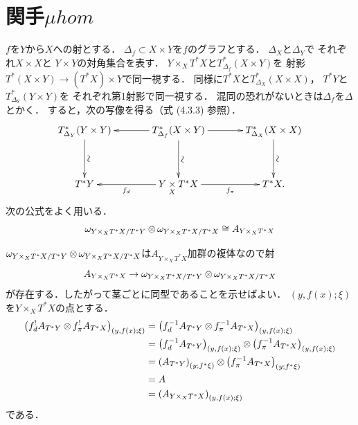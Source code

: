 \documentclass[leqno, 10pt, a4paper, dvipdfmx]{jsarticle}
\makeatletter
\theoremstyle{definition}
\renewenvironment{proof}[1][\proofname]{\par
  \pushQED{\qed}%
  \normalfont \topsep6\p@\@plus6\p@\relax
  \trivlist
  \item[\hskip\labelsep
         \bfseries
    {#1}]\ignorespaces
}{%
  \popQED\endtrivlist\@endpefalse
}
\renewcommand{\proofname}{証明.}
\numberwithin{equation}{section}
\newcommand{\tens}[1][]{\mathbin{\otimes_{\raise1.5ex\hbox to-.1em{}{#1}}}}
\newcommand{\pb}[1][]{\mathbin{\mathop{\times}\limits_{#1}}}
\theoremstyle{mystyle}
\newcommand{\mpb}[1][]{{#1}_{\pi}} %
\newcommand{\mdiff}[1][]{{#1}_{d}} %
\newcommand{\cotb}[1][]{T^{\ast}{#1}}
\newcommand{\muhom}{\mu hom}
\newcommand{\mucat}[2][]{\mathsf{D}^{\mathrm{b}}_{#1}(#2)}
\newcommand{\diag}[1][]{\Delta_{#1}}
\makeatother
\begin{document}
\section{関手\(\muhom\)}
\(f\)を\(Y\)から\(X\)への射とする．
\(\diag[f]\subset X\times Y\)を\(f\)のグラフとする．
\(\diag[X]\)と\(\diag[Y]\)で
それぞれ\(X\times X\)と
\(Y\times Y\)の対角集合を表す．
\(Y\mathbin{\times_{X}}\cotb[X]\)と\(T^{\ast}_{\diag[f]}(X\times Y)\)を
射影\(\cotb[(X\times Y)]\to(\cotb[X])\times Y\)で同一視する．
同様に\(\cotb[X]\)と\(T^{\ast}_{\diag[X]}(X\times X)\)，
\(\cotb[Y]\)と\(T^{\ast}_{\diag[Y]}(Y\times Y)\)を
それぞれ第1射影で同一視する．
混同の恐れがないときは\(\diag[f]\)を\(\diag\)とかく．
すると，次の写像を得る（式 (4.3.3) 参照）．
\begin{equation}\label{eq:4.4.1}
  \vcenter{\xymatrix@C=36pt@R=36pt{
    T^{\ast}_{\diag[Y]}(Y\times Y)
    \ar[d]^-{\rotatebox{90}{\(\sim\)}}
    &
    T^{\ast}_{\diag[f]}(X\times Y)
    \ar[d]^-{\rotatebox{90}{\(\sim\)}}
    \ar[l]
    \ar[r]
    &
    T^{\ast}_{\diag[X]}(X\times X)
    \ar[d]^-{\rotatebox{90}{\(\sim\)}}
    \\
    \cotb[Y]
    &
    Y\pb[X]\cotb[X]
    \ar[l]^-{\mdiff[f]}
    \ar[r]_-{\mpb[f]}
    &
    \cotb[X].
  }}
\end{equation}
次の公式をよく用いる．
\begin{equation}\label{eq:4.4.2}
  \omega_{{Y\mathbin{\times_{X}}\cotb[X]}\mathbin{/}\cotb[Y]}
  \tens[]
  \omega_{{Y\mathbin{\times_{X}}\cotb[X]}\mathbin{/}\cotb[X]}
  \cong
  A_{Y\mathbin{\times_{X}}\cotb[X]}
\end{equation}
\begin{proof}
  \(
    \omega_{{Y\mathbin{\times_{X}}\cotb[X]}\mathbin{/}\cotb[Y]}
    \tens[]
    \omega_{{Y\mathbin{\times_{X}}\cotb[X]}\mathbin{/}\cotb[X]}
  \)は\(A_{Y\mathbin{\times_{X}}\cotb[X]}\)加群の複体なので射
  \[
    A_{Y\mathbin{\times_{X}}\cotb[X]}
    \to
    \omega_{{Y\mathbin{\times_{X}}\cotb[X]}\mathbin{/}\cotb[Y]}
    \tens[]
    \omega_{{Y\mathbin{\times_{X}}\cotb[X]}\mathbin{/}\cotb[X]}
  \]
  が存在する．したがって茎ごとに同型であることを示せばよい．
  \((y,f(x);\xi)\)を\(Y\mathbin{\times_{X}}\cotb[X]\)の点とする．
  \begin{align*}
    \left(
      \mdiff[f]^{!}A_{\cotb[Y]}\tens[]\mpb[f]^{!}A_{\cotb[X]}
    \right)_{(y,f(x);\xi)}
    &=\left(
      \mdiff[f]^{-1}A_{\cotb[Y]}\tens[]\mpb[f]^{-1}A_{\cotb[X]}
    \right)_{(y,f(x);\xi)}\\
    &=\left(\mdiff[f]^{-1}A_{\cotb[Y]}\right)_{(y,f(x);\xi)}
    \tens[]\left(\mpb[f]^{-1}A_{\cotb[X]}
    \right)_{(y,f(x);\xi)}\\
    &=\left(A_{\cotb[Y]}\right)_{(y;f^{\ast}\xi)}
    \tens[]\left(\mpb[f]^{-1}A_{\cotb[X]}
    \right)_{(y;f^{\ast}\xi)}\\
    &=A\\
    &=\left(A_{Y\mathbin{\times_{X}}\cotb[X]}\right)_{(y,f(x);\xi)}
  \end{align*}
  である．
\end{proof}
\end{document}
